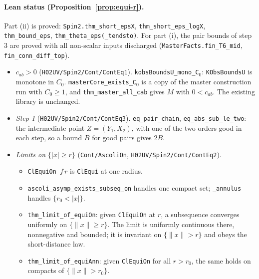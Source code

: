 \documentclass[11pt]{amsart}
\theoremstyle{definition}
\theoremstyle{remark}
\numberwithin{equation}{section}
\begin{document}
\paragraph{Lean status (Proposition~\ref{prop:equi-r}).} Part (ii) is proved: \texttt{Spin2.thm\_short\_epsX},
\texttt{thm\_short\_eps\_logX}, \texttt{thm\_bound\_eps}, \texttt{thm\_theta\_eps(\_tendsto)}. For part (i), the pair
bounds of step 3 are proved with all non-scalar inputs discharged (\texttt{MasterFacts.fin\_T6\_mid},
\texttt{fin\_conn\_diff\_top}).
\begin{itemize}
\item \emph{$c_{ab}>0$} (\texttt{H02UV/Spin2/Cont/ContEq1}). \texttt{kobsBoundsU\_mono\_C\(_0\)}: \texttt{KObsBoundsU} is monotone in
$C_0$. \texttt{masterCore\_exists\_C\(_0\)} is a copy of the master construction run with $C_0\ge1$, and
\texttt{thm\_master\_all\_cab} gives $M$ with $0<c_{ab}$. The existing library is unchanged.
\item \emph{Step 1} (\texttt{H02UV/Spin2/Cont/ContEq3}). \texttt{eq\_pair\_chain}, \texttt{eq\_abs\_sub\_le\_two}: the intermediate
point $Z=(Y_1,X_2)$, with one of the two orders good in each step, so a bound $B$ for good pairs gives $2B$.
\item \emph{Limits on $\{|x|\ge r\}$} (\texttt{Cont/AscoliOn}, \texttt{H02UV/Spin2/Cont/ContEq2}).
\begin{itemize}
\item \texttt{ClEquiOn}~$f\,r$ is \texttt{ClEqui} at one radius.
\item \texttt{ascoli\_asymp\_exists\_subseq\_on} handles one compact set; \texttt{\_annulus} handles $\{r_0<|x|\}$.
\item \texttt{thm\_limit\_of\_equiOn}: given \texttt{ClEquiOn} at $r$, a subsequence converges uniformly on
$\{\|x\|\ge r\}$. The limit is uniformly continuous there, nonnegative and bounded; it is invariant on $\{\|x\|>r\}$ and
obeys the short-distance law.
\item \texttt{thm\_limit\_of\_equiAnn}: given \texttt{ClEquiOn} for all $r>r_0$, the same holds on compacts of
$\{\|x\|>r_0\}$.
\end{itemize}
\end{itemize}
\end{document}
